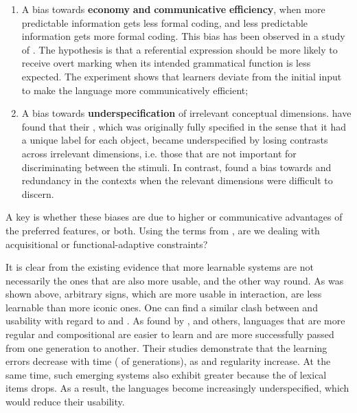 \documentclass[output=paper]{langsci/langscibook}
\begin{document}
\begin{enumerate}
\item 
A bias towards \textbf{economy} \textbf{and} \textbf{communicative} \textbf{efficiency}, when more predictable information gets less formal coding, and less predictable information gets more formal coding. This bias has been observed in a study of  \citep{FedzechkinaEtAl2012}. The hypothesis is that a referential expression should be more likely to receive overt  marking when its intended grammatical function is less expected. The experiment shows that learners deviate from the initial input to make the language more communicatively efficient;
\item 
A bias towards \textbf{underspecification} of irrelevant conceptual dimensions. \citet{SilveyEtAl2015} have found that their , which was originally fully specified in the sense that it had a unique label for each object, became underspecified by losing contrasts across irrelevant dimensions, i.e. those that are not important for discriminating between the stimuli. In contrast, \citet{TinitsEtAl2017} found a bias towards  and redundancy in the contexts when the relevant dimensions were difficult to discern.  
\end{enumerate}

A key  is whether these biases are due to higher  or communicative advantages of the preferred features, or both. Using the terms from , are we dealing with acquisitional or functional-adaptive constraints? 

It is clear from the existing evidence that more learnable systems are not necessarily the ones that are also more usable, and the other way round. As was shown above, arbitrary signs, which are more usable in interaction, are less learnable than more iconic ones. One can find a similar clash between  and usability with regard to  and . As found by \citet{KirbyEtAl2008}, \citet{Verhoef2012} and others, languages that are more regular and compositional are easier to learn and are more successfully passed from one generation to another. Their studies demonstrate that the learning errors decrease with time ( of generations), as  and regularity increase. At the same time, such emerging systems also exhibit greater  because the  of lexical items drops. As a result, the languages become increasingly underspecified, which would reduce their usability. 
\end{document}
